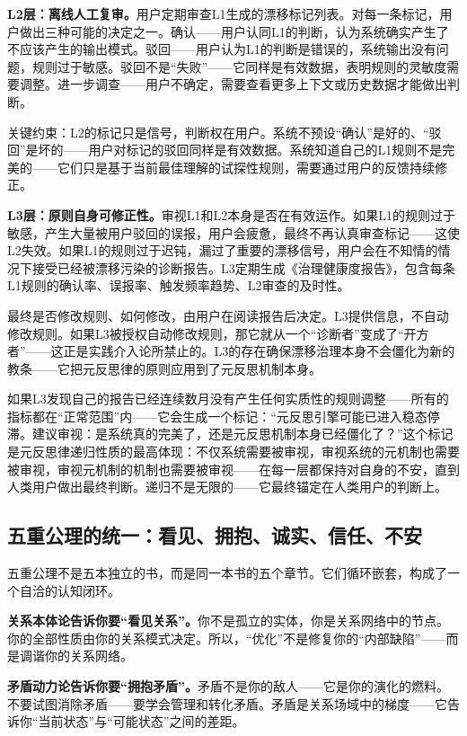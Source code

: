 \documentclass[11pt,a4paper]{book}
\theoremstyle{definition}
\begin{document}
\textbf{L2层：离线人工复审。}用户定期审查L1生成的漂移标记列表。对每一条标记，用户做出三种可能的决定之一。确认——用户认同L1的判断，认为系统确实产生了不应该产生的输出模式。驳回——用户认为L1的判断是错误的，系统输出没有问题，规则过于敏感。驳回不是“失败”——它同样是有效数据，表明规则的灵敏度需要调整。进一步调查——用户不确定，需要查看更多上下文或历史数据才能做出判断。

关键约束：L2的标记只是信号，判断权在用户。系统不预设“确认”是好的、“驳回”是坏的——用户对标记的驳回同样是有效数据。系统知道自己的L1规则不是完美的——它们只是基于当前最佳理解的试探性规则，需要通过用户的反馈持续修正。

\textbf{L3层：原则自身可修正性。}审视L1和L2本身是否在有效运作。如果L1的规则过于敏感，产生大量被用户驳回的误报，用户会疲惫，最终不再认真审查标记——这使L2失效。如果L1的规则过于迟钝，漏过了重要的漂移信号，用户会在不知情的情况下接受已经被漂移污染的诊断报告。L3定期生成《治理健康度报告》，包含每条L1规则的确认率、误报率、触发频率趋势、L2审查的及时性。

最终是否修改规则、如何修改，由用户在阅读报告后决定。L3提供信息，不自动修改规则。如果L3被授权自动修改规则，那它就从一个“诊断者”变成了“开方者”——这正是实践介入论所禁止的。L3的存在确保漂移治理本身不会僵化为新的教条——它把元反思律的原则应用到了元反思机制本身。

如果L3发现自己的报告已经连续数月没有产生任何实质性的规则调整——所有的指标都在“正常范围”内——它会生成一个标记：“元反思引擎可能已进入稳态停滞。建议审视：是系统真的完美了，还是元反思机制本身已经僵化了？”这个标记是元反思律递归性质的最高体现：不仅系统需要被审视，审视系统的元机制也需要被审视，审视元机制的机制也需要被审视——在每一层都保持对自身的不安，直到人类用户做出最终判断。递归不是无限的——它最终锚定在人类用户的判断上。

\subsection{五重公理的统一：看见、拥抱、诚实、信任、不安}

五重公理不是五本独立的书，而是同一本书的五个章节。它们循环嵌套，构成了一个自洽的认知闭环。

\textbf{关系本体论告诉你要“看见关系”。}你不是孤立的实体，你是关系网络中的节点。你的全部性质由你的关系模式决定。所以，“优化”不是修复你的“内部缺陷”——而是调谐你的关系网络。

\textbf{矛盾动力论告诉你要“拥抱矛盾”。}矛盾不是你的敌人——它是你的演化的燃料。不要试图消除矛盾——要学会管理和转化矛盾。矛盾是关系场域中的梯度——它告诉你“当前状态”与“可能状态”之间的差距。
\end{document}
